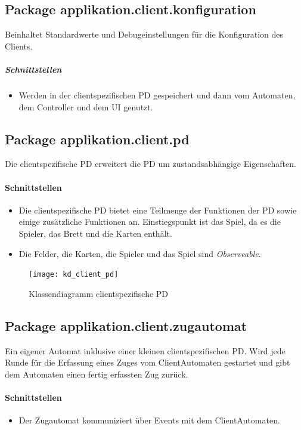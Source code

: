 \documentclass[12pt,halfparskip]{scrartcl}
\begin{document}
	\subsection{Package applikation.client.konfiguration}

		Beinhaltet Standardwerte und Debugeinstellungen für die Konfiguration des Clients.	

		\subparagraph{Schnittstellen}
		\begin{itemize}
			\item Werden in der clientspezifischen PD gespeichert und dann vom Automaten, dem Controller und dem UI genutzt.
		\end{itemize}
	
	\subsection{Package applikation.client.pd}

		Die clientspezifische PD erweitert die PD um zustandsabhängige Eigenschaften.

		\paragraph{Schnittstellen}
		\begin{itemize}
			\item Die clientspezifische PD bietet eine Teilmenge der Funktionen der PD sowie einige zusätzliche Funktionen an. Einstiegspunkt ist das Spiel, da es die Spieler, das Brett und die Karten enthält.
			\item Die Felder, die Karten, die Spieler und das Spiel sind \emph{Observeable}.
		\end{itemize}

		\begin{figure}[H]
			\centering
			\texttt{[image: kd\_client\_pd]}
			\caption{Klassendiagramm clientspezifische PD}
			\label{fig:kd_client_pd}
		\end{figure}
		
	\subsection{Package applikation.client.zugautomat}

		Ein eigener Automat inklusive einer kleinen clientspezifischen PD. Wird jede Runde für die Erfassung eines Zuges vom ClientAutomaten gestartet und gibt dem Automaten einen fertig erfassten Zug zurück.

		\paragraph{Schnittstellen}
		\begin{itemize}
			\item Der Zugautomat kommuniziert über Events mit dem ClientAutomaten.
		\end{itemize}
		
\end{document}
